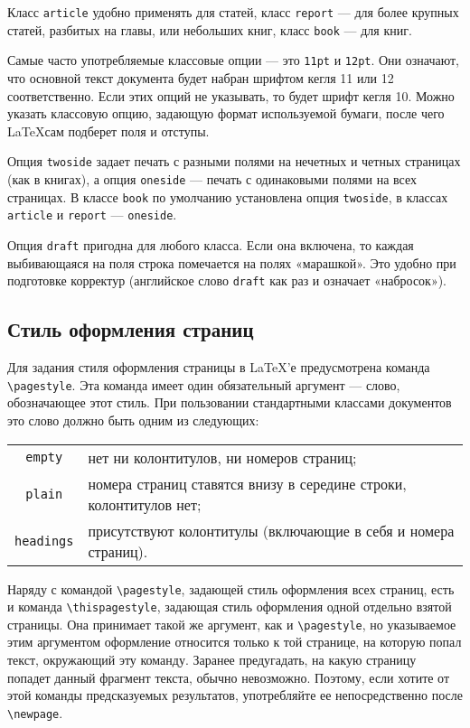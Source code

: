 \documentclass[a4paper,11pt]{article} %
\begin{document}
Класс {\tt article} удобно применять для статей, класс {\tt report} — для более крупных статей, разбитых на главы, или небольших книг, класс {\tt book} — для книг.

Самые часто употребляемые классовые опции — это {\tt 11pt} и {\tt 12pt}. Они означают, что основной текст документа будет набран шрифтом кегля 11 или 12 соответственно. Если этих опций не указывать, то будет шрифт кегля 10. Можно указать классовую опцию, задающую формат используемой бумаги, после чего \LaTeX{}сам подберет поля и отступы.

Опция {\tt twoside} задает печать с разными полями на нечетных и четных страницах (как в книгах), а опция {\tt oneside} — печать с одинаковыми полями на всех страницах. В классе {\tt book} по умолчанию установлена опция {\tt twoside}, в классах {\tt article} и {\tt report} --- {\tt oneside}.

Опция {\tt draft} пригодна для любого класса. Если она включена, то каждая выбивающаяся на поля строка помечается на полях «марашкой». Это удобно при подготовке корректур (английское слово {\tt draft} как раз и означает «набросок»).

\subsection{Стиль оформления страниц}

Для задания стиля оформления страницы в \LaTeX’е предусмотрена команда \verb"\pagestyle". Эта команда имеет один обязательный аргумент --- слово, обозначающее этот стиль. При пользовании стандартными классами документов это слово должно быть одним из следующих:
\begin{center}
	\begin{tabular}{cl}
		{\tt empty} & нет ни колонтитулов, ни номеров страниц; \\
		{\tt plain} & номера страниц ставятся внизу в середине строки, колонтитулов нет; \\
		{\tt headings} & присутствуют колонтитулы (включающие в себя и номера страниц).
	\end{tabular}
\end{center}

Наряду с командой \verb"\pagestyle", задающей стиль оформления всех страниц, есть и команда \verb"\thispagestyle", задающая стиль оформления одной отдельно взятой страницы. Она принимает такой же аргумент, как и \verb"\pagestyle", но указываемое этим аргументом оформление относится только к той странице, на которую попал текст, окружающий эту команду. Заранее предугадать, на какую страницу попадет данный фрагмент текста, обычно невозможно. Поэтому, если хотите от этой команды предсказуемых результатов, употребляйте ее непосредственно после \verb"\newpage".
\end{document}
